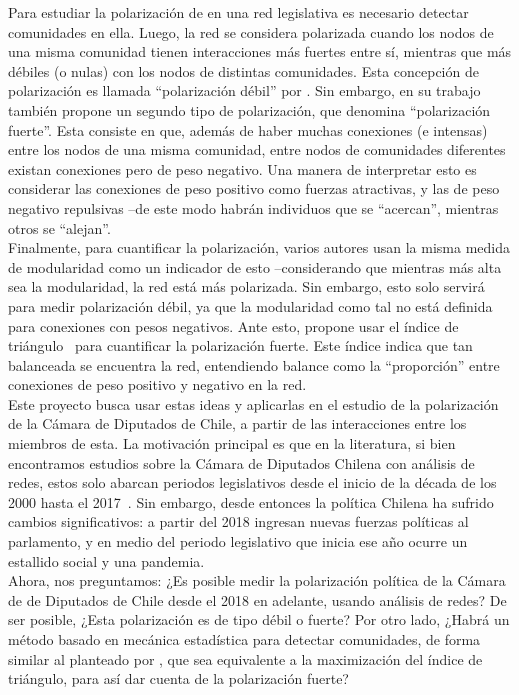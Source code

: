 \documentclass{proyectotesis}
\begin{document}
Para estudiar la polarización de en una red legislativa es necesario detectar comunidades en ella. Luego, la red se considera polarizada cuando los nodos de una misma comunidad tienen interacciones más fuertes entre sí, mientras que más débiles (o nulas) con los nodos de distintas comunidades. Esta concepción de polarización es llamada ``polarización débil'' por \citet{neal_sign_2020}. Sin embargo, en su trabajo también propone un segundo tipo de polarización, que denomina ``polarización fuerte''. Esta consiste en que, además de haber muchas conexiones (e intensas) entre los nodos de una misma comunidad, entre nodos de comunidades diferentes existan conexiones pero de peso negativo. Una manera de interpretar esto es considerar las conexiones de peso positivo como fuerzas atractivas, y las de peso negativo repulsivas --de este modo habrán individuos que se ``acercan'', mientras otros se ``alejan''.\\

Finalmente, para cuantificar la polarización, varios autores usan la misma medida de modularidad como un indicador de esto --considerando que mientras más alta sea la modularidad, la red está más polarizada. Sin embargo, esto solo servirá para medir polarización débil, ya que la modularidad como tal no está definida para conexiones con pesos negativos. Ante esto, \citet{neal_sign_2020} propone usar el índice de triángulo~\cite{aref_measuring_2018} para cuantificar la polarización fuerte. Este índice indica que tan balanceada se encuentra la red, entendiendo balance como la ``proporción'' entre conexiones de peso positivo y negativo en la red.\\

Este proyecto busca usar estas ideas y aplicarlas en el estudio de la polarización de la Cámara de Diputados de Chile, a partir de las interacciones entre los miembros de esta. La motivación principal es que en la literatura, si bien encontramos estudios sobre la Cámara de Diputados Chilena con análisis de redes, estos solo abarcan periodos legislativos desde el inicio de la década de los 2000 hasta el 2017~\cite{aleman_explaining_2013, le_foulon_moran_cooperation_2020}. Sin embargo, desde entonces la política Chilena ha sufrido cambios significativos: a partir del 2018 ingresan nuevas fuerzas políticas al parlamento, y en medio del periodo legislativo que inicia ese año ocurre un estallido social y una pandemia.\\

Ahora, nos preguntamos: ¿Es posible medir la polarización política de la Cámara de de Diputados de Chile desde el 2018 en adelante, usando análisis de redes? De ser posible, ¿Esta polarización es de tipo débil o fuerte? Por otro lado, ¿Habrá un método basado en mecánica estadística para detectar comunidades, de forma similar al planteado por \citet{reichardt_statistical_2006},  que sea equivalente a la maximización del índice de triángulo, para así dar cuenta de la polarización fuerte? %
\end{document}
